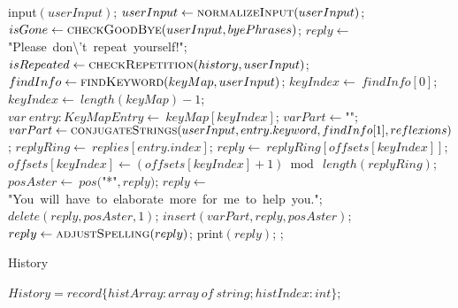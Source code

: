 \documentclass[a4paper,10pt]{article}
\begin{document}
\begin{algorithm}
\begin{algorithmic}[5]
  \Repeat
    \State \(\)input\((userInput)\);
    \State {}
    \State {}
    \State \(userInput\gets\Call{normalizeInput}{userInput}\);
    \State \(isGone\gets\Call{checkGoodBye}{userInput,byePhrases}\);
      \State \(reply\gets\)"{}Please\ don\textbackslash{}'{}t\ repeat\ yourself!"{}\(\);
      \State \(isRepeated\gets\Call{checkRepetition}{history,userInput}\);
        \State \(findInfo\gets\Call{findKeyword}{keyMap,userInput}\);
        \State \(keyIndex\gets\ findInfo[0]\);
          \State \(keyIndex\gets\ length(keyMap)-1\);
        \EndIf
        \State \(var\ entry:KeyMapEntry\gets\ keyMap[keyIndex]\);
        \State \(varPart\gets\)"{}"{}\(\);
          \State \(varPart\gets\Call{conjugateStrings}{userInput,entry.keyword,findInfo[1],reflexions}\);
        \EndIf
        \State \(replyRing\gets\ replies[entry.index]\);
        \State \(reply\gets\ replyRing[offsets[keyIndex]]\);
        \State \(offsets[keyIndex]\gets(offsets[keyIndex]+1)\bmod\ length(replyRing)\);
        \State \(posAster\gets\ pos(\)"{}*"{}\(,reply)\);
            \State \(reply\gets\)"{}You\ will\ have\ to\ elaborate\ more\ for\ me\ to\ help\ you."{}\(\);
          \Else
            \State \(delete(reply,posAster,1)\);
            \State \(insert(varPart,reply,posAster)\);
          \EndIf
        \EndIf
        \State \(reply\gets\Call{adjustSpelling}{reply}\);
      \EndIf
      \State \(\)print\((reply)\);
    \EndIf
  ;
\EndProcedure
\end{algorithmic}
\end{algorithm}


\begin{algorithm}
\caption{History}
\begin{algorithmic}[5]
\State {}
  \State {}
  \State {}
  \State {}
  \State {}
  \State {}
  \State {}
    \State \(History = record\{histArray:array\ of\ string;histIndex:int\}\);
  \EndDecl
\EndProcedure
\end{algorithmic}
\end{algorithm}
\end{document}
